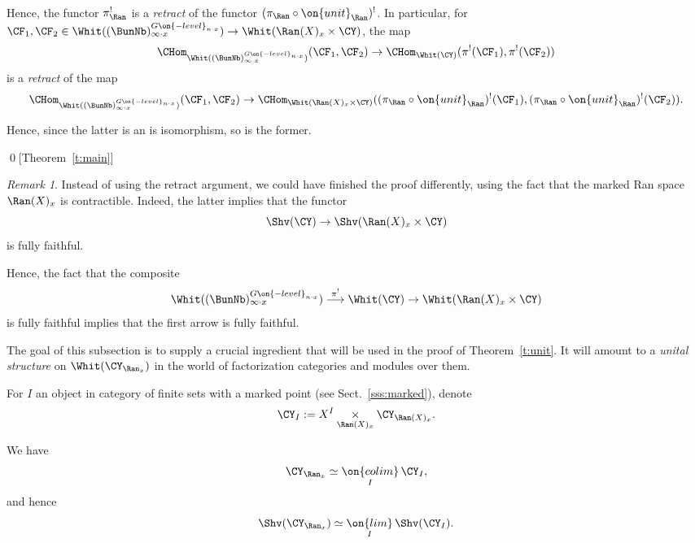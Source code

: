 \documentclass[9pt]{amsart}
\theoremstyle{definition}
\theoremstyle{remark}
\newtheorem{rem}[subsubsection]{Remark}
\newcommand{\thmref}[1]{Theorem~\ref{#1}}
\newcommand{\secref}[1]{Sect.~\ref{#1}}
\numberwithin{equation}{section}
\begin{document}
\medskip

Hence, the functor $\pi_\Ran^!$ is a \emph{retract} of the functor $(\pi_\Ran \circ \on{unit}_\Ran)^!$. In particular,
for $\CF_1,\CF_2\in \Whit((\BunNb)^{G\on{-level}_{n\cdot x}}_{\infty\cdot x})\to \Whit(\Ran(X)_x\times \CY)$, the map
$$\CHom_{\Whit((\BunNb)^{G\on{-level}_{n\cdot x}}_{\infty\cdot x})}(\CF_1,\CF_2) \to
\CHom_{\Whit(\CY)}(\pi^!(\CF_1),\pi^!(\CF_2))$$
is a \emph{retract} of the map
$$\CHom_{\Whit((\BunNb)^{G\on{-level}_{n\cdot x}}_{\infty\cdot x})}(\CF_1,\CF_2) \to
\CHom_{\Whit(\Ran(X)_x\times \CY)}((\pi_\Ran\circ \on{unit}_\Ran)^!(\CF_1),(\pi_\Ran\circ \on{unit}_\Ran)^!(\CF_2)).$$

\medskip

Hence, since the latter is an is isomorphism, so is the former. 

\qed[\thmref{t:main}]

\begin{rem}
Instead of using the retract argument, we could have finished the proof differently, using the fact that the marked Ran space
$\Ran(X)_x$ is contractible. Indeed, the latter implies that the functor
$$\Shv(\CY)\to \Shv(\Ran(X)_x\times \CY)$$
is fully faithful. 

\medskip

Hence, the fact that the composite 
$$\Whit((\BunNb)^{G\on{-level}_{n\cdot x}}_{\infty\cdot x}) \overset{\pi^!}\longrightarrow \Whit(\CY)\to 
\Whit(\Ran(X)_x\times \CY)$$
is fully faithful implies that the first arrow is fully faithful.
\end{rem} 

  \label{ss:proof of unit}

The goal of this subsection is to supply a crucial ingredient that will be used in the proof of 
\thmref{t:unit}. It will amount to a \emph{unital structure} on $\Whit(\CY_{\Ran_x} )$ in the world of factorization
categories and modules over them. 

\sssec{}

For $I$ an object in category of finite sets with a marked point (see \secref{sss:marked}), denote
$$\CY_I:=X^I\underset{\Ran(X)_x}\times \CY_{\Ran(X)_x}.$$

We have
$$\CY_{\Ran_x} \simeq \underset{I}{\on{colim}}\, \CY_I,$$
and hence
\begin{equation} \label{e:Y Ran}
\Shv(\CY_{\Ran_x} )\simeq \underset{I}{\on{lim}}\, \Shv(\CY_I).
\end{equation}

\medskip
\end{document}
